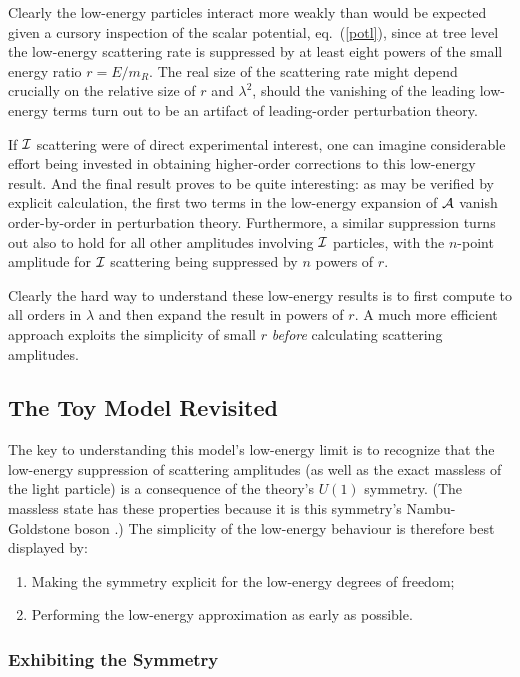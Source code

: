 \documentclass[11pt]{article}
\begin{document}
Clearly the low-energy particles interact more weakly than would
be expected given a cursory inspection of the scalar potential,
eq.~(\ref{potl}), since at tree level the low-energy scattering
rate is suppressed by at least eight powers of the small energy
ratio $r = E/m_{\scriptscriptstyle R}$. The real size of the
scattering rate might depend crucially on the relative size of $r$
and $\lambda^2$, should the vanishing of the leading low-energy
terms turn out to be an artifact of leading-order perturbation
theory.

If ${\cal I}$ scattering were of direct experimental interest, one
can imagine considerable effort being invested in obtaining
higher-order corrections to this low-energy result. And the final
result proves to be quite interesting: as may be verified by
explicit calculation, the first two terms in the low-energy
expansion of ${\cal A}$ vanish order-by-order in perturbation
theory. Furthermore, a similar suppression turns out also to hold
for all other amplitudes involving ${\cal I}$ particles, with the
$n$-point amplitude for ${\cal I}$ scattering being suppressed by
$n$ powers of $r$.

Clearly the hard way to understand these low-energy results is to
first compute to all orders in $\lambda$ and then expand the
result in powers of $r$. A much more efficient approach exploits
the simplicity of small $r$ {\sl before} calculating scattering
amplitudes.

\subsection{The Toy Model Revisited}
%
The key to understanding this model's low-energy limit is to
recognize that the low-energy suppression of scattering amplitudes
(as well as the exact massless of the light particle) is a
consequence of the theory's $U(1)$ symmetry. (The massless state
has these properties because it is this symmetry's Nambu-Goldstone
boson \cite{ChiPT,physica,GBreviews,Burgess00}.) The simplicity of
the low-energy behaviour is therefore best displayed by:

\begin{enumerate}
\item
Making the symmetry explicit for the low-energy degrees of
freedom;
%
\item
Performing the low-energy approximation as early as possible.
%
\end{enumerate}

\subsubsection{Exhibiting the Symmetry}
\end{document}
